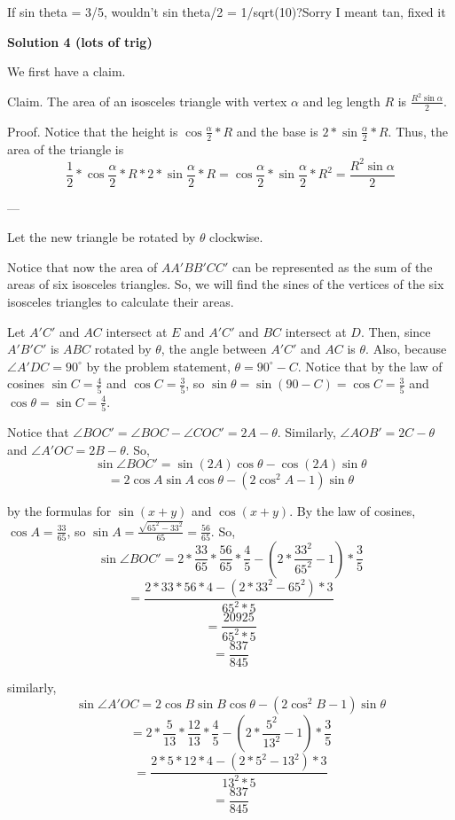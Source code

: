 \begin{enumerate}
 
If sin theta = 3/5, wouldn't sin theta/2 = 1/sqrt(10)?Sorry I meant tan, fixed it

 



\textbf{Solution 4 (lots of trig)}

We first have a claim.

 Claim. The area of an isosceles triangle with vertex $\alpha$ and leg length $R$ is $\frac{R^2\sin\alpha}{2}$.

 Proof. Notice that the height is $\cos\frac{\alpha}{2}*R$ and the base is $2*\sin\frac{\alpha}{2}*R$. Thus, the area of the triangle is
 \[\frac{1}{2}*\cos\frac{\alpha}{2}*R*2*\sin\frac{\alpha}{2}*R=\cos\frac{\alpha}{2}*\sin\frac{\alpha}{2}*R^2=\frac{R^2\sin\alpha}{2}\]

 ---

 Let the new triangle be rotated by $\theta$ clockwise.

 Notice that now the area of $AA'BB'CC'$ can be represented as the sum of the areas of six isosceles triangles. So, we will find the sines of the vertices of the six isosceles triangles to calculate their areas.

 Let $A'C'$ and $AC$ intersect at $E$ and $A'C'$ and $BC$ intersect at $D$. Then, since $A'B'C'$ is $ABC$ rotated by $\theta$, the angle between $A'C'$ and $AC$ is $\theta$. Also, because $\angle A'DC=90^{\circ}$ by the problem statement, $\theta=90^{\circ}-C$. Notice that by the law of cosines $\sin C=\frac{4}{5}$ and $\cos C=\frac{3}{5}$, so $\sin\theta=\sin(90-C)=\cos C=\frac{3}{5}$ and $\cos \theta=\sin C=\frac{4}{5}$.

 Notice that $\angle BOC'=\angle BOC-\angle COC'=2A-\theta$. Similarly, $\angle AOB'=2C-\theta$ and $\angle A'OC=2B-\theta$. So,
 \[\sin\angle BOC'=\sin(2A)\cos \theta-\cos(2A)\sin\theta\]
 \[=2\cos A\sin A\cos\theta-(2\cos^2A-1)\sin\theta\]

 by the formulas for $\sin(x+y)$ and $\cos(x+y)$. By the law of cosines, $\cos A=\frac{33}{65}$, so $\sin A=\frac{\sqrt{65^2-33^2}}{65}=\frac{56}{65}$. So,
 \[\sin\angle BOC'=2*\frac{33}{65}*\frac{56}{65}*\frac{4}{5}-(2*\frac{33^2}{65^2}-1)*\frac{3}{5}\]
 \[=\frac{2*33*56*4-(2*33^2-65^2)*3}{65^2*5}\]
 \[=\frac{20925}{65^2*5}\]
 \[=\frac{837}{845}\]

 similarly,
 \[\sin\angle A'OC=2\cos B\sin B\cos\theta-(2\cos^2B-1)\sin\theta\]
 \[=2*\frac{5}{13}*\frac{12}{13}*\frac{4}{5}-(2*\frac{5^2}{13^2}-1)*\frac{3}{5}\]
 \[=\frac{2*5*12*4-(2*5^2-13^2)*3}{13^2*5}\]
 \[=\frac{837}{845}\]


\end{enumerate}
